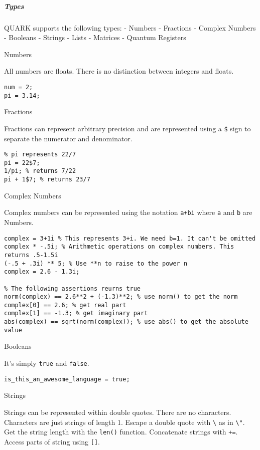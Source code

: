\documentclass[]{article}
\begin{document}
\subparagraph{Types}\label{types}

QUARK supports the following types: - Numbers - Fractions - Complex
Numbers - Booleans - Strings - Lists - Matrices - Quantum Registers

Numbers

All numbers are floats. There is no distinction between integers and
floats.

\begin{verbatim}
num = 2;
pi = 3.14;
\end{verbatim}

Fractions

Fractions can represent arbitrary precision and are represented using a
\texttt{\$} sign to separate the numerator and denominator.

\begin{verbatim}
% pi represents 22/7
pi = 22$7;
1/pi; % returns 7/22
pi + 1$7; % returns 23/7
\end{verbatim}

Complex Numbers

Complex numbers can be represented using the notation \texttt{a+bi}
where \texttt{a} and \texttt{b} are Numbers.

\begin{verbatim}
complex = 3+1i % This represents 3+i. We need b=1. It can't be omitted
complex * -.5i; % Arithmetic operations on complex numbers. This returns .5-1.5i
(-.5 + .3i) ** 5; % Use **n to raise to the power n
complex = 2.6 - 1.3i;

% The following assertions reurns true
norm(complex) == 2.6**2 + (-1.3)**2; % use norm() to get the norm
complex[0] == 2.6; % get real part
complex[1] == -1.3; % get imaginary part
abs(complex) == sqrt(norm(complex)); % use abs() to get the absolute value
\end{verbatim}

Booleans

It's simply \texttt{true} and \texttt{false}.

\begin{verbatim}
is_this_an_awesome_language = true;
\end{verbatim}

Strings

Strings can be represented within double quotes. There are no
characters. Characters are just strings of length 1. Escape a double
quote with \texttt{\textbackslash{}} as in \texttt{\textbackslash{}"}.
Get the string length with the \texttt{len()} function. Concatenate
strings with \texttt{+=}. Access parts of string using \texttt{{[}{]}}.
\end{document}
